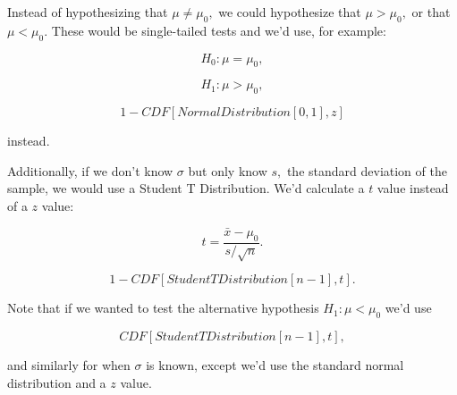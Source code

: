 \documentclass{article}
\begin{document}
Instead of hypothesizing that $\mu \neq \mu_0,$ we could hypothesize that $\mu > \mu_0,$ or that $\mu < \mu_0.$ These would be single-tailed tests and we'd use, for example:

\[ H_0: \mu = \mu_0, \]

\[ H_1: \mu > \mu_0, \]

\[ 1 - CDF[NormalDistribution[0, 1], z] \]
 
instead.

Additionally, if we don't know $\sigma$ but only know $s,$ the \@{standard deviation} of the sample, we would use a Student T Distribution. We'd calculate a $t$ value instead of a $z$ value:

\[ t = \frac{\bar{x} - \mu_0}{s / \sqrt{n}}. \]

\[ 1 - CDF[StudentTDistribution[n-1], t]. \]

Note that if we wanted to test the alternative hypothesis $H_1: \mu < \mu_0$ we'd use

\[ CDF[StudentTDistribution[n-1], t], \]

and similarly for when $\sigma$ is known, except we'd use the \@{standard normal distribution} and a $z$ value.
\end{document}
